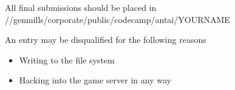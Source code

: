 \documentclass{article}
\begin{document}
\noindent All final submissions should be placed in //genmills/corporate/public/codecamp/antai/YOURNAME
\newline
\newline

\noindent An entry may be disqualified for the following reasons
\begin{itemize}
  \item Writing to the file system
  \item Hacking into the game server in any way
\end{itemize}
\end{document}
